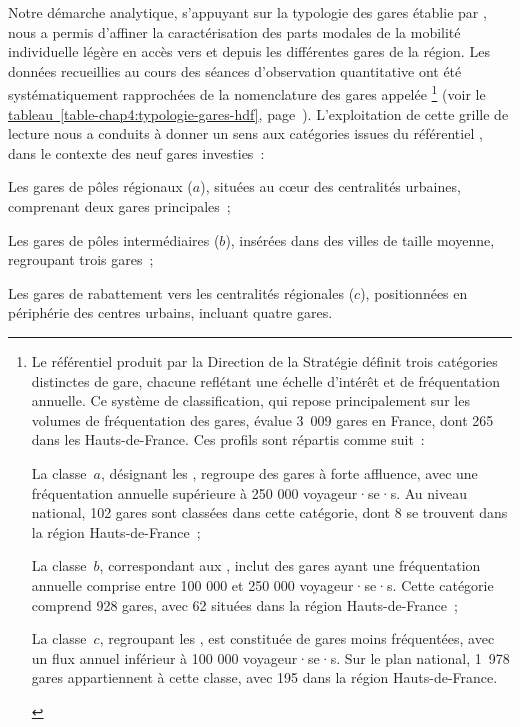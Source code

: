 \begin{refsegment}
Notre démarche analytique, s'appuyant sur la typologie des gares établie par \textcolor{blue}{\textcite{sncf_gares__connexions_gares_2024}}, nous a permis d'affiner la caractérisation des parts modales de la mobilité individuelle légère en accès vers et depuis les différentes gares de la région. Les données recueillies au cours des séances d'observation quantitative ont été systématiquement rapprochées de la nomenclature des gares appelée \footnote{
    Le référentiel  produit par la Direction de la Stratégie \textcolor{blue}{\textcite{sncf_gares__connexions_gares_2024}} définit trois catégories distinctes de gare, chacune reflétant une échelle d'intérêt et de fréquentation annuelle. Ce système de classification, qui repose principalement sur les volumes de fréquentation des gares, évalue 3~009 gares en France, dont 265 dans les Hauts-de-France. Ces profils sont répartis comme suit~: 
    \begin{customitemize}
    \item La classe~\(a\), désignant les , regroupe des gares à forte affluence, avec une fréquentation annuelle supérieure à 250 000 voyageur·se·s. Au niveau national, 102 gares sont classées dans cette catégorie, dont 8 se trouvent dans la région Hauts-de-France~;
    \item La classe~\(b\), correspondant aux , inclut des gares ayant une fréquentation annuelle comprise entre 100 000 et 250 000 voyageur·se·s. Cette catégorie comprend 928 gares, avec 62 situées dans la région Hauts-de-France~;
    \item La classe~\(c\), regroupant les , est constituée de gares moins fréquentées, avec un flux annuel inférieur à 100 000 voyageur·se·s. Sur le plan national, 1~978 gares appartiennent à cette classe, avec 195 dans la région Hauts-de-France.
    \end{customitemize}
} (voir le \hyperref[table-chap4:typologie-gares-hdf]{tableau~\ref{table-chap4:typologie-gares-hdf}}, page~\pageref{table-chap4:typologie-gares-hdf}). L'exploitation de cette grille de lecture nous a conduits à donner un sens aux catégories issues du référentiel , dans le contexte des neuf gares investies~:
    \begin{customitemize}
\item Les gares de pôles régionaux (\(a\)), situées au cœur des centralités urbaines, comprenant deux gares principales~;
\item Les gares de pôles intermédiaires (\(b\)), insérées dans des villes de taille moyenne, regroupant trois gares~;
\item Les gares de rabattement vers les centralités régionales (\(c\)), positionnées en périphérie des centres urbains, incluant quatre gares.
    \end{customitemize}%


\end{refsegment}
